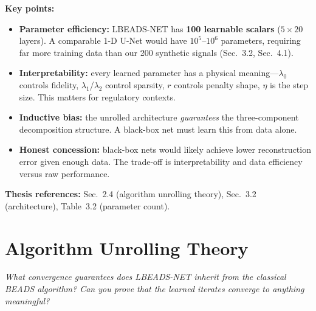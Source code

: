 \documentclass[11pt, letterpaper]{article}
\newcounter{qcounter}
\newcommand{\question}[1]{%
  \stepcounter{qcounter}%
  \begin{questionbox}[Q\theqcounter]%
    \itshape #1%
  \end{questionbox}%
}
\begin{document}
\begin{answerbox}
\textbf{Key points:}
\begin{itemize}[nosep]
  \item \textbf{Parameter efficiency:} LBEADS-NET has \textbf{100 learnable
        scalars} ($5 \times 20$ layers).  A comparable 1-D U-Net would
        have $10^5$--$10^6$ parameters, requiring far more training data
        than our 200 synthetic signals (Sec.~3.2, Sec.~4.1).
  \item \textbf{Interpretability:} every learned parameter has a physical
        meaning---$\lambda_0$ controls fidelity, $\lambda_1$/$\lambda_2$
        control sparsity, $r$ controls penalty shape, $\eta$ is the
        step size.  This matters for regulatory contexts.
  \item \textbf{Inductive bias:} the unrolled architecture \emph{guarantees}
        the three-component decomposition structure.  A black-box net
        must learn this from data alone.
  \item \textbf{Honest concession:} black-box nets would likely achieve
        lower reconstruction error given enough data.  The trade-off
        is interpretability and data efficiency versus raw performance.
\end{itemize}
\textbf{Thesis references:} Sec.~2.4 (algorithm unrolling theory), Sec.~3.2 (architecture), Table~3.2 (parameter count).
\end{answerbox}


\section{Algorithm Unrolling Theory}

\question{What convergence guarantees does LBEADS-NET inherit from the
classical BEADS algorithm?  Can you prove that the learned iterates
converge to anything meaningful?}
\end{document}

